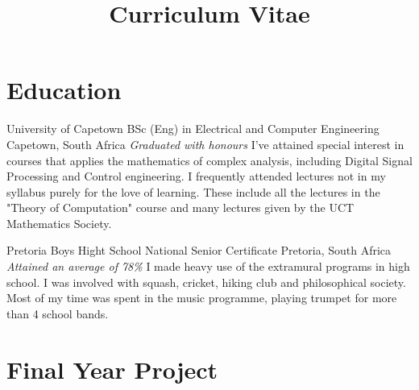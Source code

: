 \documentclass[11pt,a4paper,sans]{moderncv}
\title{Curriculum Vitae}
\begin{document}
\makecvtitle


\section{Education}

{University of Capetown}
{BSc (Eng) in Electrical and Computer Engineering}
{\newline Capetown, South Africa}
{\textit{Graduated with honours}}
{I've attained special interest in courses that applies the mathematics of complex
analysis, including Digital Signal Processing and Control engineering. I
frequently attended lectures not in my syllabus purely for the love of learning.
These include all the lectures in the "Theory of Computation" course and many
lectures given by the UCT Mathematics Society.}

\vspace{2mm}
{Pretoria Boys Hight School}
{National Senior Certificate}
{\newline Pretoria, South Africa}
{\textit{Attained an average of 78\%}}
{I made heavy use of the extramural programs in high school. I was involved with
squash, cricket, hiking club and philosophical society. Most of my time was spent
in the music programme, playing trumpet for more than 4 school bands.}

\section{Final Year Project}
\end{document}
